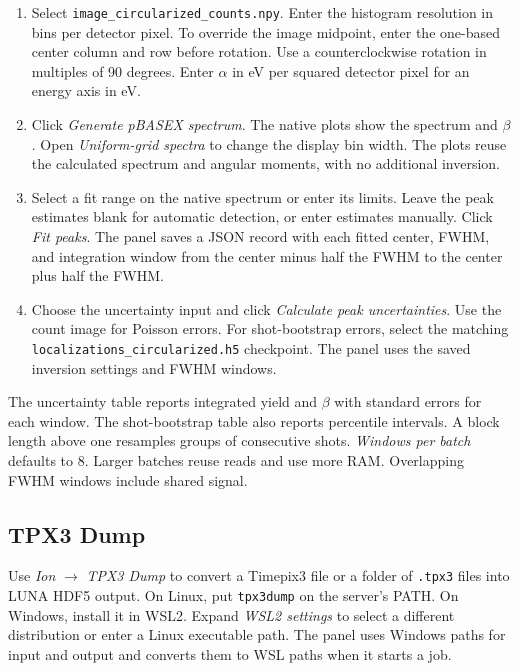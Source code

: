 \documentclass[11pt,a4paper]{article}
\newcommand{\code}[1]{\texttt{#1}}
\begin{document}
\begin{enumerate}
  \item Select \code{image\_circularized\_counts.npy}. Enter the histogram
        resolution in bins per detector pixel. To override the image midpoint,
        enter the one-based center column and row before rotation. Use a
        counterclockwise rotation in multiples of 90 degrees. Enter $\alpha$
        in eV per squared detector pixel for an energy axis in eV.
  \item Click \emph{Generate pBASEX spectrum}. The native plots show the
        spectrum and $\beta$. Open \emph{Uniform-grid spectra} to change the
        display bin width. The plots reuse the calculated spectrum and angular
        moments, with no additional inversion.
  \item Select a fit range on the native spectrum or enter its limits.
        Leave the peak estimates blank for automatic detection, or enter
        estimates manually. Click \emph{Fit peaks}. The panel
        saves a JSON record with each fitted center, FWHM, and integration window
        from the center minus half the FWHM to the center plus half the FWHM.
  \item Choose the uncertainty input and click \emph{Calculate peak uncertainties}.
        Use the count image for Poisson errors. For shot-bootstrap errors,
        select the matching \code{localizations\_circularized.h5} checkpoint.
        The panel uses the saved inversion settings and FWHM windows.
\end{enumerate}

The uncertainty table reports integrated yield and $\beta$ with standard
errors for each window. The shot-bootstrap table also reports percentile
intervals. A block length above one resamples groups of consecutive shots.
\emph{Windows per batch} defaults to 8. Larger batches reuse reads and use
more RAM. Overlapping FWHM windows include shared signal.

\subsection{TPX3 Dump}
\label{sec:tpx3dump}

Use \emph{Ion} $\rightarrow$ \emph{TPX3 Dump} to convert a Timepix3 file
or a folder of \code{.tpx3} files into LUNA HDF5 output.
On Linux, put \code{tpx3dump} on the server's PATH. On Windows, install it
in WSL2. Expand \emph{WSL2 settings} to select a different distribution or
enter a Linux executable path. The panel uses Windows paths for input and
output and converts them to WSL paths when it starts a job.
\end{document}
